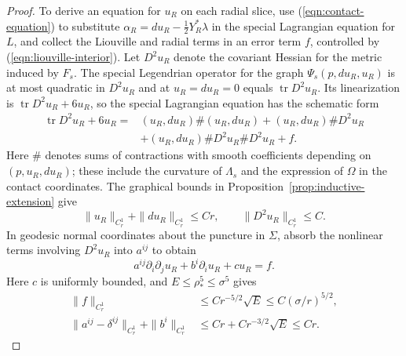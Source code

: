 \documentclass[11pt,a4paper]{article}
\numberwithin{equation}{section}
\theoremstyle{definition}
\theoremstyle{remark}
\begin{document}
\begin{proof}
		To derive an equation for $u_R$ on each radial slice, use
		(\ref{eqn:contact-equation}) to substitute $\alpha_R=du_R-\tfrac12Y_R^*\lambda$
		in the special Lagrangian equation for $L$, and collect the Liouville and
		radial terms in an error term $f$, controlled by (\ref{eqn:liouville-interior}).
		Let $D^2u_R$ denote the covariant Hessian for the metric
		induced by $F_s$. The special Legendrian operator for the graph
		$\Psi_s(p,du_R,u_R)$ is at most quadratic in $D^2u_R$ and at
		$u_R=du_R=0$ equals $\operatorname{tr}D^2u_R$.
		Its linearization is $\operatorname{tr}D^2u_R+6u_R$, so the special
		Lagrangian equation has the schematic form
		\[
		\begin{split}
			\operatorname{tr}D^2u_R+6u_R
			={}&(u_R,du_R)\#(u_R,du_R)+(u_R,du_R)\#D^2u_R\\
			&+(u_R,du_R)\#D^2u_R\#D^2u_R+f.
		\end{split}
		\]
		Here $\#$ denotes sums of contractions with smooth coefficients depending
		on $(p,u_R,du_R)$; these include the curvature of $\Lambda_s$ and the
		expression of $\Omega$ in the contact coordinates.
		The graphical bounds in Proposition~\ref{prop:inductive-extension} give
		\[
		\|u_R\|_{C^1_r}+\|du_R\|_{C^1_r}\le Cr,\qquad
		\|D^2u_R\|_{C^1_r}\le C.
		\]
		In geodesic normal coordinates about the puncture in $\Sigma$, absorb the
		nonlinear terms involving $D^2u_R$ into $a^{ij}$ to obtain
		\begin{equation}\label{eqn:potential-equation}
			a^{ij}\partial_i\partial_j u_R+b^i\partial_i u_R+cu_R=f.
		\end{equation}
		Here $c$ is uniformly bounded, and $E\le\rho_*^5\le\sigma^5$ gives
		\begin{equation}\label{eqn:potential-equation-bounds}
			\begin{split}
				\|f\|_{C^1_r}&\le Cr^{-5/2}\sqrt E
				\le C(\sigma/r)^{5/2},\\
				\|a^{ij}-\delta^{ij}\|_{C^1_r}+\|b^i\|_{C^1_r}
				&\le Cr+Cr^{-3/2}\sqrt E\le Cr.
			\end{split}
		\end{equation}
		

\end{proof}
\end{document}
